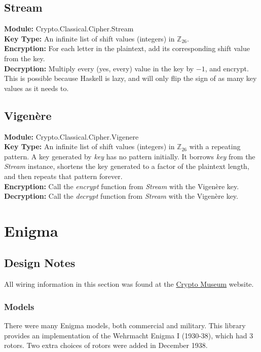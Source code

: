 \documentclass{article}
\begin{document}
\subsection{Stream}
\textbf{Module:} Crypto.Classical.Cipher.Stream\\
\textbf{Key Type:} An infinite list of shift values (integers) in
$\mathbb{Z}_{26}$.\\
\textbf{Encryption:} For each letter in the plaintext, add its corresponding
shift value from the key.\\
\textbf{Decryption:} Multiply every (yes, every) value in the key by $-1$,
and encrypt. This is possible because Haskell is lazy, and will only
flip the sign of as many key values as it needs to.

\subsection{Vigenère}
\textbf{Module:} Crypto.Classical.Cipher.Vigenere\\
\textbf{Key Type:} An infinite list of shift values (integers) in
$\mathbb{Z}_{26}$ with a repeating pattern.
A key generated by \emph{key} has no pattern initially.
It borrows \emph{key} from the \emph{Stream} instance,
shortens the key generated to a factor of the plaintext length,
and then repeats
that pattern forever.\\
\textbf{Encryption:} Call the \emph{encrypt} function from \emph{Stream}
with the Vigenère key.\\
\textbf{Decryption:} Call the \emph{decrypt} function from \emph{Stream}
with the Vigenère key.


\section{Enigma}

\subsection{Design Notes}
All wiring information in this section was found at the
\href{http://www.cryptomuseum.com/crypto/enigma/wiring.htm}{Crypto Museum}
website.

\subsubsection{Models}
There were many Enigma models, both commercial and military. This library
provides an implementation of the Wehrmacht Enigma I (1930-38), which
had 3 rotors. Two extra choices of rotors were added in December 1938.
\end{document}
